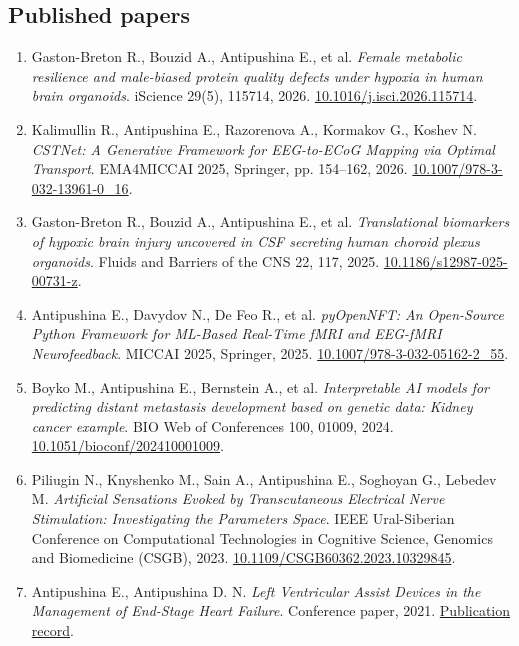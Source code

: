 \documentclass[10pt,a4paper]{article}
\begin{document}
\subsection*{Published papers}
\begin{enumerate}
\item Gaston-Breton R., Bouzid A., Antipushina E., et al. \textit{Female metabolic resilience and male-biased protein quality defects under hypoxia in human brain organoids}. iScience 29(5), 115714, 2026. \href{https://doi.org/10.1016/j.isci.2026.115714}{10.1016/j.isci.2026.115714}.
\item Kalimullin R., Antipushina E., Razorenova A., Kormakov G., Koshev N. \textit{CSTNet: A Generative Framework for EEG-to-ECoG Mapping via Optimal Transport}. EMA4MICCAI 2025, Springer, pp. 154–162, 2026. \href{https://doi.org/10.1007/978-3-032-13961-0_16}{10.1007/978-3-032-13961-0\_16}.
\item Gaston-Breton R., Bouzid A., Antipushina E., et al. \textit{Translational biomarkers of hypoxic brain injury uncovered in CSF secreting human choroid plexus organoids}. Fluids and Barriers of the CNS 22, 117, 2025. \href{https://doi.org/10.1186/s12987-025-00731-z}{10.1186/s12987-025-00731-z}.
\item Antipushina E., Davydov N., De Feo R., et al. \textit{pyOpenNFT: An Open-Source Python Framework for ML-Based Real-Time fMRI and EEG-fMRI Neurofeedback}. MICCAI 2025, Springer, 2025. \href{https://doi.org/10.1007/978-3-032-05162-2_55}{10.1007/978-3-032-05162-2\_55}.
\item Boyko M., Antipushina E., Bernstein A., et al. \textit{Interpretable AI models for predicting distant metastasis development based on genetic data: Kidney cancer example}. BIO Web of Conferences 100, 01009, 2024. \href{https://doi.org/10.1051/bioconf/202410001009}{10.1051/bioconf/202410001009}.
\item Piliugin N., Knyshenko M., Sain A., Antipushina E., Soghoyan G., Lebedev M. \textit{Artificial Sensations Evoked by Transcutaneous Electrical Nerve Stimulation: Investigating the Parameters Space}. IEEE Ural-Siberian Conference on Computational Technologies in Cognitive Science, Genomics and Biomedicine (CSGB), 2023. \href{https://doi.org/10.1109/CSGB60362.2023.10329845}{10.1109/CSGB60362.2023.10329845}.
\item Antipushina E., Antipushina D. N. \textit{Left Ventricular Assist Devices in the Management of End-Stage Heart Failure}. Conference paper, 2021. \href{https://www.researchgate.net/publication/387017833_LEFT_VENTRICULARASSIST_DEVICES_IN_THE_MANAGEMENT_OF_END-STAGE_HEART_FAILURE}{Publication record}.
\end{enumerate}
\end{document}
